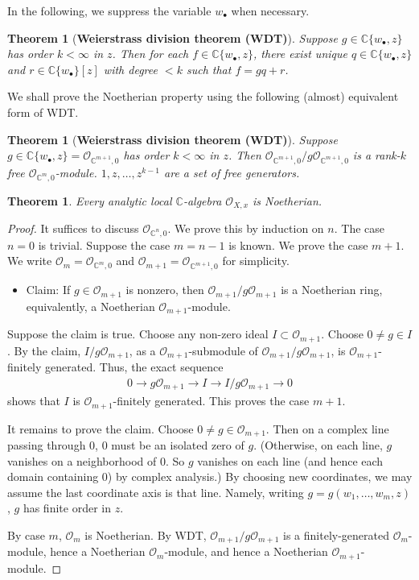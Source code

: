 \documentclass[12pt,b5paper,notitlepage]{report}
\theoremstyle{definition}
\theoremstyle{plain}
\newtheorem{thm}[df]{Theorem}
\newcommand{\scr}{\mathscr}
\newcommand{\blt}{\bullet}
\newcommand{\Cbb}{\mathbb C}
\numberwithin{equation}{section}
\begin{document}
In the following, we suppress the variable $w_\blt$ when necessary.

\begin{thm}[\textbf{Weierstrass division theorem (WDT)}]\label{lb197} 
Suppose $g\in\Cbb\{w_\blt,z\}$ has order $k<\infty$ in $z$. Then for each $f\in\Cbb\{w_\blt,z\}$, there exist unique $q\in\Cbb\{w_\blt,z\}$ and $r\in\Cbb\{w_\blt\}[z]$ with degree $<k$ such that $f=gq+r$.
\end{thm}


We shall prove the Noetherian property using the following (almost) equivalent form of WDT.
\begin{thm}[\textbf{Weierstrass division theorem (WDT)}] 
Suppose $g\in\Cbb\{w_\blt,z\}=\scr O_{\Cbb^{m+1},0}$ has order $k<\infty$ in $z$. Then $\scr O_{\Cbb^{m+1},0}/g\scr O_{\Cbb^{m+1},0}$ is a rank-$k$ free $\scr O_{\Cbb^m,0}$-module. $1,z,\dots,z^{k-1}$ are a set of free generators.
\end{thm}


\begin{thm}\label{lb70}
Every analytic local $\Cbb$-algebra $\scr O_{X,x}$ is Noetherian.
\end{thm}

\begin{proof}
It suffices to discuss $\scr O_{\Cbb^n,0}$. We prove this by induction on $n$. The case $n=0$ is trivial. Suppose the case $m=n-1$ is known. We prove the case $m+1$. We write $\scr O_m=\scr O_{\Cbb^m,0}$ and $\scr O_{m+1}=\scr O_{\Cbb^{m+1},0}$ for simplicity.
\begin{itemize}
\item Claim: If $g\in\scr O_{m+1}$ is nonzero, then $\scr O_{m+1}/g\scr O_{m+1}$ is a Noetherian ring, equivalently, a Noetherian $\scr O_{m+1}$-module.
\end{itemize}


Suppose the claim is true. Choose any non-zero ideal $I\subset\scr O_{m+1}$. Choose $0\neq g\in I$. By the claim, $I/g\scr O_{m+1}$, as a $\scr O_{m+1}$-submodule of $\scr O_{m+1}/g\scr O_{m+1}$, is $\scr O_{m+1}$-finitely generated. Thus, the exact sequence
\begin{align*}
0\rightarrow g\scr O_{m+1}\rightarrow I\rightarrow I/g\scr O_{m+1}\rightarrow0
\end{align*}
shows that $I$ is $\scr O_{m+1}$-finitely generated. This proves the case $m+1$.

It remains to prove the claim. Choose $0\neq g\in\scr O_{m+1}$. Then on a complex line passing through $0$, $0$ must be an isolated zero of $g$. (Otherwise, on each line, $g$ vanishes on a neighborhood of $0$. So $g$ vanishes on each line (and hence each domain containing $0$) by complex analysis.) By choosing new coordinates, we may assume the last coordinate axis is that line. Namely, writing $g=g(w_1,\dots,w_m,z)$, $g$ has finite order in $z$. 

By case $m$, $\scr O_m$ is Noetherian. By WDT, $\scr O_{m+1}/g\scr O_{m+1}$ is a finitely-generated $\scr O_m$-module, hence a Noetherian $\scr O_m$-module, and hence a Noetherian $\scr O_{m+1}$-module.
\end{proof}
\end{document}

